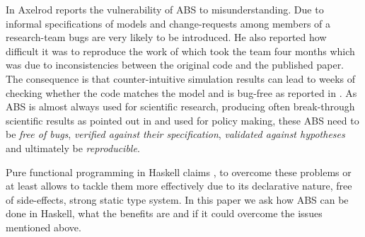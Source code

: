In \cite{axelrod_chapter_2006} Axelrod reports the vulnerability of ABS to misunderstanding. Due to informal specifications of models and change-requests among members of a research-team bugs are very likely to be introduced. He also reported how difficult it was to reproduce the work of \cite{axelrod_convergence_1995} which took the team four months which was due to inconsistencies between the original code and the published paper. The consequence is that counter-intuitive simulation results can lead to weeks of checking whether the code matches the model and is bug-free as reported in \cite{axelrod_advancing_1997}. As ABS is almost always used for scientific research, producing often break-through scientific results as pointed out in \cite{axelrod_chapter_2006} and used for policy making, these ABS need to be \textit{free of bugs}, \textit{verified against their specification}, \textit{validated against hypotheses} and ultimately be \textit{reproducible}.

Pure functional programming in Haskell claims \cite{hudak_history_2007}, \cite{hudak_haskell_1994} to overcome these problems or at least allows to tackle them more effectively due to its declarative nature, free of side-effects, strong static type system. In this paper we ask how ABS can be done in Haskell, what the benefits are and if it could overcome the issues mentioned above.
